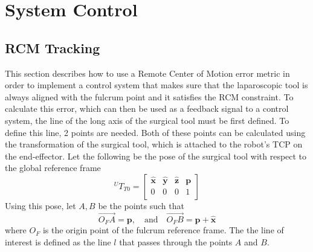 \chapter{System Control}

\section{RCM Tracking}
\label{section:rcm-tracking}

This section describes how to use a Remote Center of Motion error metric in order to implement a control system that makes sure that the laparoscopic tool is always aligned with the fulcrum point and it satisfies the RCM 
constraint. To calculate this error, which can then be used as a feedback signal to a control system, the line of the long axis of the surgical tool must be first defined. To define this line, 2 points are needed. Both of these 
points can be calculated using the transformation of the surgical tool, which is attached to the robot's TCP on the end-effector. Let the following be the pose of the surgical tool with respect to the global reference frame
\begin{equation}
{}^UT_{T0} = \begin{bmatrix}
\mathbf{\hat{x}} & \mathbf{\hat{y}} & \mathbf{\hat{z}} & \mathbf{p} \\
0                & 0                & 0                & 1 \\
\end{bmatrix}
\end{equation}
Using this pose, let $A,B$ be the points such that 
\begin{equation}
\overrightarrow{O_FA} = \mathbf{p}, \quad \textrm{and} \quad \overrightarrow{O_FB} = \mathbf{p} + \mathbf{\hat{x}}
\end{equation}
where $O_F$ is the origin point of the fulcrum reference frame. The the line of interest is defined as the line $l$ that passes through the points $A$ and $B$. \\

